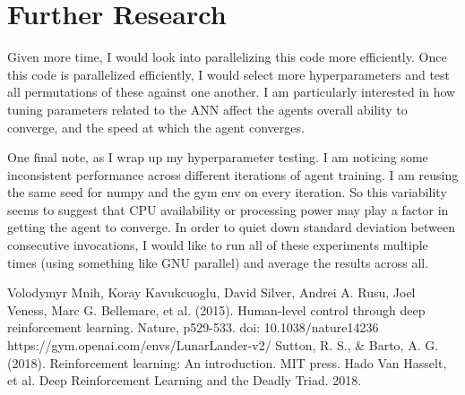 \documentclass[conference]{IEEEtran}
\begin{document}
\section{Further Research}
Given more time, I would look into parallelizing this code more efficiently. Once this code is parallelized efficiently, I would select more hyperparameters and test all permutations of these against one another. I am particularly interested in how tuning parameters related to the ANN affect the agents overall ability to converge, and the speed at which the agent converges.

One final note, as I wrap up my hyperparameter testing. I am noticing some inconsistent performance across different iterations of agent training. I am reusing the same seed for numpy and the gym env on every iteration. So this variability seems to suggest that CPU availability or processing power may play a factor in getting the agent to converge. In order to quiet down standard deviation between consecutive invocations, I would like to run all of these experiments multiple times (using something like GNU parallel) and average the results across all.

\begin{thebibliography}{00}
 Volodymyr Mnih, Koray Kavukcuoglu, David Silver, Andrei A. Rusu, Joel Veness, Marc G. Bellemare, et al. (2015). Human-level control through deep reinforcement learning. Nature, p529-533. doi: 10.1038/nature14236
 https://gym.openai.com/envs/LunarLander-v2/
 Sutton, R. S., & Barto, A. G. (2018). Reinforcement learning: An introduction. MIT press.
 Hado Van Hasselt, et al. Deep Reinforcement Learning and the Deadly Triad. 2018.
\end{thebibliography}
\end{document}
